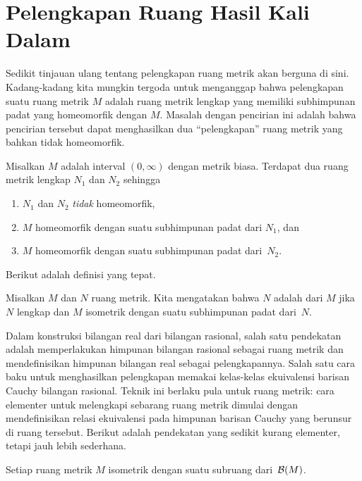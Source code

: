 \section{Pelengkapan Ruang Hasil Kali Dalam}
Sedikit tinjauan ulang tentang pelengkapan ruang metrik akan berguna di sini. Kadang-kadang
kita mungkin tergoda untuk menganggap bahwa pelengkapan suatu ruang metrik $M$ adalah ruang
metrik lengkap yang memiliki subhimpunan padat yang homeomorfik dengan $M$. Masalah dengan
pencirian ini adalah bahwa pencirian tersebut dapat menghasilkan dua “pelengkapan” ruang
metrik yang bahkan tidak homeomorfik.

\begin{exam} Misalkan $M$ adalah interval $(0,\infty)$ dengan metrik biasa. Terdapat dua
ruang metrik lengkap $N_1$ dan $N_2$ sehingga
  \begin{enumerate}
    \item $N_1$ dan $N_2$ \emph{tidak} homeomorfik,
    \item $M$ homeomorfik dengan suatu subhimpunan padat dari $N_1$, dan
    \item $M$ homeomorfik dengan suatu subhimpunan padat dari~$N_2$.
  \end{enumerate}
\end{exam}

Berikut adalah definisi yang tepat.

\begin{defn}\label{C035511} Misalkan $M$ dan $N$ ruang metrik. Kita mengatakan bahwa $N$
adalah
 dari $M$ jika $N$ lengkap dan $M$ isometrik dengan suatu subhimpunan
padat dari~$N$.
\end{defn}

Dalam konstruksi bilangan real dari bilangan rasional, salah satu pendekatan adalah
memperlakukan himpunan bilangan rasional sebagai ruang metrik dan mendefinisikan himpunan
bilangan real sebagai pelengkapannya. Salah satu cara baku untuk menghasilkan pelengkapan
memakai kelas-kelas ekuivalensi barisan Cauchy bilangan rasional. Teknik ini berlaku pula
untuk ruang metrik: cara elementer untuk melengkapi sebarang ruang metrik dimulai dengan
mendefinisikan relasi ekuivalensi pada himpunan barisan Cauchy yang berunsur di ruang
tersebut. Berikut adalah pendekatan yang sedikit kurang elementer, tetapi jauh lebih sederhana.

\begin{prop} Setiap ruang metrik $M$ isometrik dengan suatu subruang dari~$\mathcal{B}(M)$.
\end{prop}

